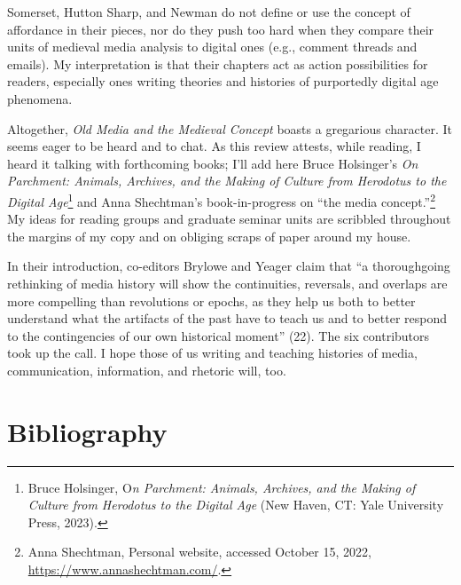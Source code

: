 \documentclass{tufte-handout}
\begin{document}
Somerset, Hutton Sharp, and Newman do not define or use the concept of
affordance in their pieces, nor do they push too hard when they compare
their units of medieval media analysis to digital ones (e.g., comment
threads and emails). My interpretation is that their chapters act as
action possibilities for readers, especially ones writing theories and
histories of purportedly digital age phenomena.

Altogether, \emph{Old Media and the Medieval Concept} boasts a
gregarious character. It seems eager to be heard and to chat. As this
review attests, while reading, I heard it talking with forthcoming
books; I'll add here Bruce Holsinger's \emph{On Parchment: Animals,
Archives, and the Making of Culture from Herodotus to the Digital
Age}\footnote{Bruce Holsinger, O\emph{n Parchment: Animals, Archives,
  and the Making of Culture from Herodotus to the Digital Age} (New
  Haven, CT: Yale University Press, 2023).} and Anna Shechtman's
book-in-progress on ``the media concept.''\footnote{Anna Shechtman,
  Personal website, accessed October 15, 2022,
  \url{https://www.annashechtman.com/}.} My ideas for reading groups and
graduate seminar units are scribbled throughout the margins of my copy
and on obliging scraps of paper around my house.

In their introduction, co-editors Brylowe and Yeager claim that ``a
thoroughgoing rethinking of media history will show the continuities,
reversals, and overlaps are more compelling than revolutions or epochs,
as they help us both to better understand what the artifacts of the past
have to teach us and to better respond to the contingencies of our own
historical moment'' (22). The six contributors took up the call. I hope
those of us writing and teaching histories of media, communication,
information, and rhetoric will, too.




\section{Bibliography}\label{bibliography}
\end{document}
